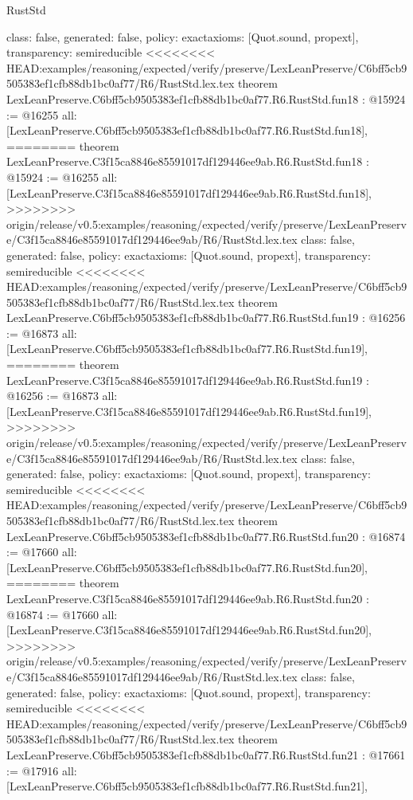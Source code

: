 \begin{lexlean}{RustStd}
\begin{coremodule}
{\begin{coremodule}
{{{{{{{{{{{{{{{{{{{{{  class: false,
  generated: false,
  policy: exact{axioms: [Quot.sound, propext]},
  transparency: semireducible
}
<<<<<<<< HEAD:examples/reasoning/expected/verify/preserve/LexLeanPreserve/C6bff5cb9505383ef1cfb88db1bc0af77/R6/RustStd.lex.tex
theorem LexLeanPreserve.C6bff5cb9505383ef1cfb88db1bc0af77.R6.RustStd.fun18 : @15924 := @16255 {
  all: [LexLeanPreserve.C6bff5cb9505383ef1cfb88db1bc0af77.R6.RustStd.fun18],
========
theorem LexLeanPreserve.C3f15ca8846e85591017df129446ee9ab.R6.RustStd.fun18 : @15924 := @16255 {
  all: [LexLeanPreserve.C3f15ca8846e85591017df129446ee9ab.R6.RustStd.fun18],
>>>>>>>> origin/release/v0.5:examples/reasoning/expected/verify/preserve/LexLeanPreserve/C3f15ca8846e85591017df129446ee9ab/R6/RustStd.lex.tex
  class: false,
  generated: false,
  policy: exact{axioms: [Quot.sound, propext]},
  transparency: semireducible
}
<<<<<<<< HEAD:examples/reasoning/expected/verify/preserve/LexLeanPreserve/C6bff5cb9505383ef1cfb88db1bc0af77/R6/RustStd.lex.tex
theorem LexLeanPreserve.C6bff5cb9505383ef1cfb88db1bc0af77.R6.RustStd.fun19 : @16256 := @16873 {
  all: [LexLeanPreserve.C6bff5cb9505383ef1cfb88db1bc0af77.R6.RustStd.fun19],
========
theorem LexLeanPreserve.C3f15ca8846e85591017df129446ee9ab.R6.RustStd.fun19 : @16256 := @16873 {
  all: [LexLeanPreserve.C3f15ca8846e85591017df129446ee9ab.R6.RustStd.fun19],
>>>>>>>> origin/release/v0.5:examples/reasoning/expected/verify/preserve/LexLeanPreserve/C3f15ca8846e85591017df129446ee9ab/R6/RustStd.lex.tex
  class: false,
  generated: false,
  policy: exact{axioms: [Quot.sound, propext]},
  transparency: semireducible
}
<<<<<<<< HEAD:examples/reasoning/expected/verify/preserve/LexLeanPreserve/C6bff5cb9505383ef1cfb88db1bc0af77/R6/RustStd.lex.tex
theorem LexLeanPreserve.C6bff5cb9505383ef1cfb88db1bc0af77.R6.RustStd.fun20 : @16874 := @17660 {
  all: [LexLeanPreserve.C6bff5cb9505383ef1cfb88db1bc0af77.R6.RustStd.fun20],
========
theorem LexLeanPreserve.C3f15ca8846e85591017df129446ee9ab.R6.RustStd.fun20 : @16874 := @17660 {
  all: [LexLeanPreserve.C3f15ca8846e85591017df129446ee9ab.R6.RustStd.fun20],
>>>>>>>> origin/release/v0.5:examples/reasoning/expected/verify/preserve/LexLeanPreserve/C3f15ca8846e85591017df129446ee9ab/R6/RustStd.lex.tex
  class: false,
  generated: false,
  policy: exact{axioms: [Quot.sound, propext]},
  transparency: semireducible
}
<<<<<<<< HEAD:examples/reasoning/expected/verify/preserve/LexLeanPreserve/C6bff5cb9505383ef1cfb88db1bc0af77/R6/RustStd.lex.tex
theorem LexLeanPreserve.C6bff5cb9505383ef1cfb88db1bc0af77.R6.RustStd.fun21 : @17661 := @17916 {
  all: [LexLeanPreserve.C6bff5cb9505383ef1cfb88db1bc0af77.R6.RustStd.fun21],
}}}}}}}}}}}}}}}}}}}}}}}}
\end{coremodule}}
\end{coremodule}
\end{lexlean}
